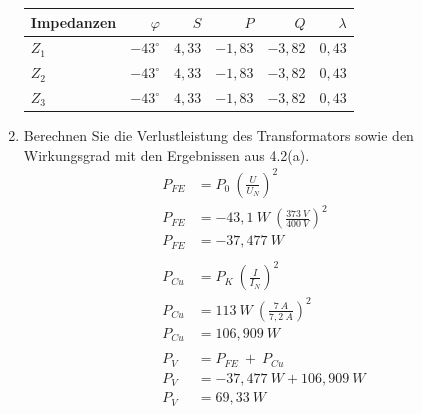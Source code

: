 \begin{enumerate}[label=\alph*)]
\begin{table}[h!]
		      \centering
		      \begin{tabular}{lrrrrr}
			      \hline
			      Impedanzen & $\varphi$     & $S$    & $P$      & $Q$     & $\lambda$ \\ \hline
			      $Z_1$      & $-43^\circ$   & $4,33$ & $-1,83$  & $-3,82$ & $0,43$    \\
			      $Z_2$      & $-43^\circ$   & $4,33$ & $-1,83 $ & $-3,82$ & $0,43$    \\
			      $Z_3$      & $-43^\circ  $ & $4,33$ & $-1,83$  & $-3,82$ & $0,43$    \\ \hline
		      \end{tabular}
	      \end{table}

	\item Berechnen Sie die Verlustleistung des Transformators sowie den Wirkungsgrad mit
	      den Ergebnissen aus 4.2(a).
	      \begin{align*}
		      P_{FE} & = P_0\ (\frac{U}{U_N})^2                                                                                                      \\
		      P_{FE} & = -43,1\ W\ (\frac{373\ V}{400\ V})^2                                                                                         \\
		      P_{FE} & = -37,477\ W                                                                                                                  \\
		      \\
		      P_{Cu} & = P_K\ (\frac{I}{I_N})^2                                                                                                      \\
		      P_{Cu} & = 113\ W\ (\frac{7\ A}{7,2\ A})^2                                                                                             \\
		      P_{Cu} & = 106,909\ W                                                                                                                 \\
		      \\
		      P_{V}  & = P_{FE} \ +\ P_{Cu}                                                                                                       \\
		      P_{V}  & = -37,477\ W + 106,909\ W                                                                                              \\
		      P_{V}  & = 69,33\ W                                                                                                                 \\

\end{align*}
\end{enumerate}
